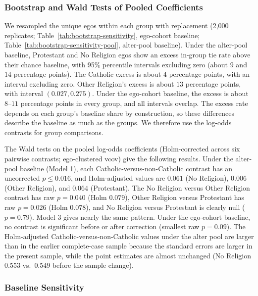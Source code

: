 \documentclass[11pt]{article}
\begin{document}
\subsubsection{Bootstrap and Wald Tests of Pooled Coefficients}

We resampled the unique egos within each group with replacement (2,000 replicates; Table~\ref{tab:bootstrap-sensitivity}, ego-cohort baseline; Table~\ref{tab:bootstrap-sensitivity-pool}, alter-pool baseline). Under the alter-pool baseline, Protestant and No Religion egos show an excess in-group tie rate above their chance baseline, with 95\% percentile intervals excluding zero (about $9$ and $14$ percentage points). The Catholic excess is about $4$ percentage points, with an interval excluding zero. Other Religion's excess is about $13$ percentage points, with interval $(0.027, 0.275)$. Under the ego-cohort baseline, the excess is about $8$--$11$ percentage points in every group, and all intervals overlap. The excess rate depends on each group's baseline share by construction, so these differences describe the baseline as much as the groups. We therefore use the log-odds contrasts for group comparisons.

The Wald tests on the pooled log-odds coefficients (Holm-corrected across six pairwise contrasts; ego-clustered vcov) give the following results. Under the alter-pool baseline (Model 1), each Catholic-versus-non-Catholic contrast has an uncorrected $p \le 0.016$, and Holm-adjusted values are $0.061$ (No Religion), $0.006$ (Other Religion), and $0.064$ (Protestant). The No Religion versus Other Religion contrast has raw $p = 0.040$ (Holm $0.079$), Other Religion versus Protestant has raw $p = 0.026$ (Holm $0.078$), and No Religion versus Protestant is clearly null ($p = 0.79$). Model 3 gives nearly the same pattern. Under the ego-cohort baseline, no contrast is significant before or after correction (smallest raw $p = 0.09$). The Holm-adjusted Catholic-versus-non-Catholic values under the alter pool are larger than in the earlier complete-case sample because the standard errors are larger in the present sample, while the point estimates are almost unchanged (No Religion $0.553$ vs.\ $0.549$ before the sample change).

\subsubsection{Baseline Sensitivity}
\end{document}
